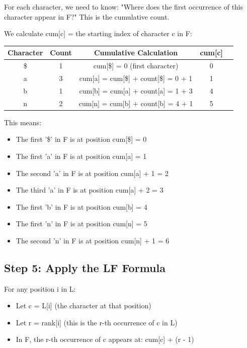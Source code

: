 \begin{examplebox}
For each character, we need to know: "Where does the first occurrence of this character appear in F?" This is the cumulative count.

We calculate cum[c] = the starting index of character c in F:

\begin{center}
\begin{tabular}{|c|c|c|c|p{5cm}|}
\hline
\textbf{Character} & \textbf{Count} & \textbf{Cumulative Calculation} & \textbf{cum[c]} \\
\hline
\$ & 1 & cum[\$] = 0 (first character) & 0 \\
a & 3 & cum[a] = cum[\$] + count[\$] = 0 + 1 & 1 \\
b & 1 & cum[b] = cum[a] + count[a] = 1 + 3 & 4 \\
n & 2 & cum[n] = cum[b] + count[b] = 4 + 1 & 5 \\
\hline
\end{tabular}
\end{center}

This means:
\begin{itemize}
    \item The first '\$' in F is at position cum[\$] = 0
    \item The first 'a' in F is at position cum[a] = 1
    \item The second 'a' in F is at position cum[a] + 1 = 2
    \item The third 'a' in F is at position cum[a] + 2 = 3
    \item The first 'b' in F is at position cum[b] = 4
    \item The first 'n' in F is at position cum[n] = 5
    \item The second 'n' in F is at position cum[n] + 1 = 6
\end{itemize}

\subsection*{Step 5: Apply the LF Formula}

For any position i in L:
\begin{itemize}
    \item Let c = L[i] (the character at that position)
    \item Let r = rank[i] (this is the r-th occurrence of c in L)
    \item In F, the r-th occurrence of c appears at: cum[c] + (r - 1)
\end{itemize}


\end{examplebox}
